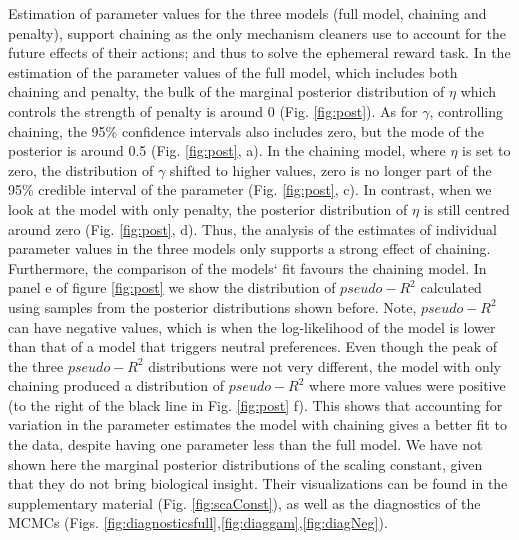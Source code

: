 \documentclass[10pt,letterpaper]{article}
\begin{document}
Estimation of parameter values for the three models (full model,
chaining and penalty), support chaining as the only mechanism cleaners
use to account for the future effects of their actions; and thus to
solve the ephemeral reward task. In the estimation of the parameter
values of the full model, which includes both chaining and penalty, the
bulk of the marginal posterior distribution of \(\eta\) which controls
the strength of penalty is around 0 (Fig. \ref{fig:post}). As for
\(\gamma\), controlling chaining, the 95\% confidence intervals also
includes zero, but the mode of the posterior is around 0.5 (Fig.
\ref{fig:post}, a). In the chaining model, where \(\eta\) is set to
zero, the distribution of \(\gamma\) shifted to higher values, zero is
no longer part of the 95\% credible interval of the parameter (Fig.
\ref{fig:post}, c). In contrast, when we look at the model with only
penalty, the posterior distribution of \(\eta\) is still centred around
zero (Fig. \ref{fig:post}, d). Thus, the analysis of the estimates of
individual parameter values in the three models only supports a strong
effect of chaining. Furthermore, the comparison of the models` fit
favours the chaining model. In panel e of figure \ref{fig:post} we show
the distribution of \(pseudo-R^2\) calculated using samples from the
posterior distributions shown before. Note, \(pseudo-R^2\) can have
negative values, which is when the log-likelihood of the model is lower
than that of a model that triggers neutral preferences. Even though the
peak of the three \(pseudo-R^2\) distributions were not very different,
the model with only chaining produced a distribution of \(pseudo-R^2\)
where more values were positive (to the right of the black line in Fig.
\ref{fig:post} f). This shows that accounting for variation in the
parameter estimates the model with chaining gives a better fit to the
data, despite having one parameter less than the full model. We have not
shown here the marginal posterior distributions of the scaling constant,
given that they do not bring biological insight. Their visualizations
can be found in the supplementary material (Fig. \ref{fig:scaConst}), as
well as the diagnostics of the MCMCs (Figs.
\ref{fig:diagnosticsfull},\ref{fig:diaggam},\ref{fig:diagNeg}).
\end{document}
